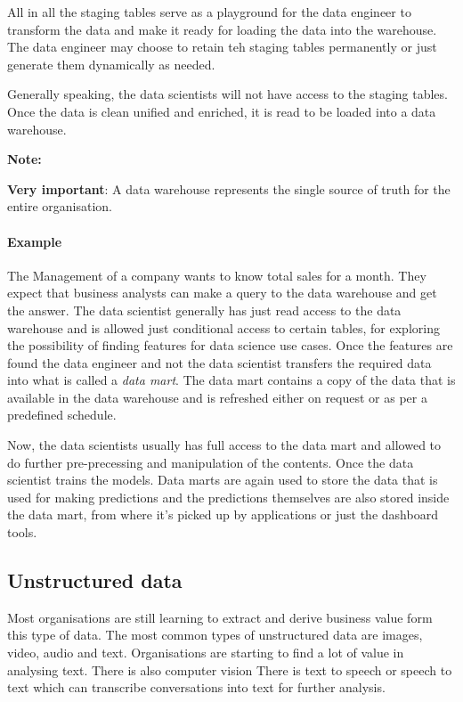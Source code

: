 \documentclass[a4paper, 11pt]{book}
\newenvironment{note}{
    \begin{siderule}
        \textbf{Note: }
        }{
    \end{siderule}}
\begin{document}
    All in all the staging tables serve as a playground for the data engineer to transform the data and make it ready for loading the data into the warehouse.
    The data engineer may choose to retain teh staging tables permanently or just generate them dynamically as needed.

    Generally speaking, the data scientists will not have access to the staging tables.
    Once the data is clean unified and enriched, it is read to be loaded into a data warehouse.

    \begin{note}
        \textbf{Very important}: A data warehouse represents the single source of truth for the entire organisation.
    \end{note}

    \paragraph{Example}
    The Management of a company wants to know total sales for a month.
    They expect that business analysts can make a query to the data warehouse and get the answer.
    The data scientist generally has just read access to the data warehouse and is allowed just conditional access to certain tables, for exploring the possibility of finding features for data science use cases.
    Once the features are found the data engineer and not the data scientist transfers the required data into what is called a \textit{data mart}.
    The data mart contains a copy of the data that is available in the data warehouse and is refreshed either on request or as per a predefined schedule.

    Now, the data scientists usually has full access to the data mart and allowed to do further pre-precessing and manipulation of the contents.
    Once the data scientist trains the models.
    Data marts are again used to store the data that is used for making predictions and the predictions themselves are also stored inside the data mart, from where it's picked up by applications or just the dashboard tools.

    \subsection{Unstructured data}
    Most organisations are still learning to extract and derive business value form this type of data.
    The most common types of unstructured data are images, video, audio and text.
    Organisations are starting to find a lot of value in analysing text.
    There is also computer vision
    There is text to speech or speech to text which can transcribe conversations into text for further analysis.
\end{document}

